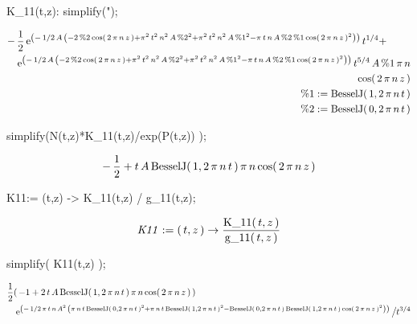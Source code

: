 \begin{mapleinput}
K_11(t,z): simplify(");
\end{mapleinput}
\begin{maplelatex}
\begin{eqnarray*}
\lefteqn{ - \,{\displaystyle \frac {1}{2}}\,{\rm e}^{ \left( \! 
\, - \,1/2\,{A}\, \left( \! \, - 2\,{\rm \%2}\,{\rm cos}(\,2\,{ 
\pi}\,{n}\,{z}\,) + { \pi}^{2}\,{t}^{2}\,{n}^{2}\,{A}\,{\rm \%2}
^{2} + { \pi}^{2}\,{t}^{2}\,{n}^{2}\,{A}\,{\rm \%1}^{2} - { \pi}
\,{t}\,{n}\,{A}\,{\rm \%2}\,{\rm \%1}\,{\rm cos}(\,2\,{ \pi}\,{n}
\,{z}\,)^{2}\, \!  \right) \, \!  \right) }\,{t}^{1/4} + } \\
 & & {\rm e}^{ \left( \! \, - \,1/2\,{A}\, \left( \! \, - 2\,
{\rm \%2}\,{\rm cos}(\,2\,{ \pi}\,{n}\,{z}\,) + { \pi}^{2}\,{t}^{
2}\,{n}^{2}\,{A}\,{\rm \%2}^{2} + { \pi}^{2}\,{t}^{2}\,{n}^{2}\,{
A}\,{\rm \%1}^{2} - { \pi}\,{t}\,{n}\,{A}\,{\rm \%2}\,{\rm \%1}\,
{\rm cos}(\,2\,{ \pi}\,{n}\,{z}\,)^{2}\, \!  \right) \, \! 
 \right) }\,{t}^{5/4}\,{A}\,{\rm \%1}\,{ \pi}\,{n} \\
 & & {\rm cos}(\,2\,{ \pi}\,{n}\,{z}\,) \\
 & & {\rm \%1} := {\rm BesselJ}(\,1, 2\,{ \pi}\,{n}\,{t}\,) \\
 & & {\rm \%2} := {\rm BesselJ}(\,0, 2\,{ \pi}\,{n}\,{t}\,)
\end{eqnarray*}
\end{maplelatex}
\begin{mapleinput}
simplify(N(t,z)*K_11(t,z)/exp(P(t,z)) );
\end{mapleinput}
\begin{maplelatex}
\[
 - \,{\displaystyle \frac {1}{2}} + {t}\,{A}\,{\rm BesselJ}(\,1, 
2\,{ \pi}\,{n}\,{t}\,)\,{ \pi}\,{n}\,{\rm cos}(\,2\,{ \pi}\,{n}\,
{z}\,)
\]
\end{maplelatex}
\begin{mapleinput}
K11:= (t,z) -> K_11(t,z) / g_11(t,z);
\end{mapleinput}
\begin{maplelatex}
\[
{\it K11} := (\,{t}, {z}\,) \rightarrow {\displaystyle \frac {
{\rm K\_11}(\,{t}, {z}\,)}{{\rm g\_11}(\,{t}, {z}\,)}}
\]
\end{maplelatex}
\begin{mapleinput}
simplify( K11(t,z) );
\end{mapleinput}
\begin{maplelatex}
\begin{eqnarray*}
\lefteqn{{\displaystyle \frac {1}{2}}(\, - 1 + 2\,{t}\,{A}\,{\rm 
BesselJ}(\,1, 2\,{ \pi}\,{n}\,{t}\,)\,{ \pi}\,{n}\,{\rm cos}(\,2
\,{ \pi}\,{n}\,{z}\,)\,)} \\
 & & {\rm e}^{ \left( \! \, - \,1/2\,{ \pi}\,{t}\,{n}\,{A}^{2}\,
 \left( \! \,{ \pi}\,{n}\,{t}\,{\rm BesselJ}(\,0, 2\,{ \pi}\,{n}
\,{t}\,)^{2} + { \pi}\,{n}\,{t}\,{\rm BesselJ}(\,1, 2\,{ \pi}\,{n
}\,{t}\,)^{2} - {\rm BesselJ}(\,0, 2\,{ \pi}\,{n}\,{t}\,)\,{\rm 
BesselJ}(\,1, 2\,{ \pi}\,{n}\,{t}\,)\,{\rm cos}(\,2\,{ \pi}\,{n}
\,{z}\,)^{2}\, \!  \right) \, \!  \right) } \left/ {\vrule 
height0.37em width0em depth0.37em} \right. \! \! {t}^{3/4}
\end{eqnarray*}
\end{maplelatex}
